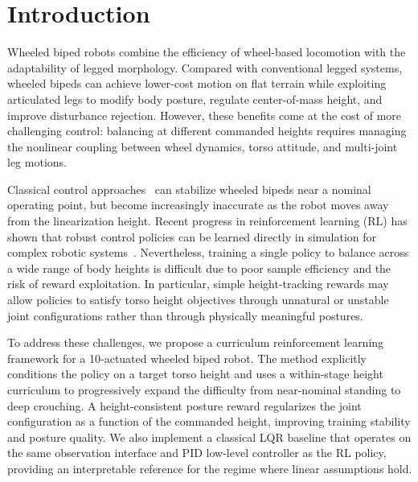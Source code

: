 \documentclass[conference]{IEEEtran}
\begin{document}
\section{Introduction}
Wheeled biped robots combine the efficiency of wheel-based locomotion with
the adaptability of legged morphology.
Compared with conventional legged systems, wheeled bipeds can achieve
lower-cost motion on flat terrain while exploiting articulated legs to modify
body posture, regulate center-of-mass height, and improve disturbance rejection.
However, these benefits come at the cost of more challenging control:
balancing at different commanded heights requires managing the nonlinear
coupling between wheel dynamics, torso attitude, and multi-joint leg motions.

Classical control approaches~\cite{klemm2020lqrwbc} can stabilize wheeled bipeds
near a nominal operating point, but become increasingly inaccurate as the
robot moves away from the linearization height.
Recent progress in reinforcement learning (RL) has shown that robust control
policies can be learned directly in simulation for complex robotic
systems~\cite{hwangbo2019learning,lee2020learning,rudin2022walk}.
Nevertheless, training a single policy to balance across a wide range of
body heights is difficult due to poor sample efficiency and the risk of
reward exploitation.
In particular, simple height-tracking rewards may allow policies to satisfy
torso height objectives through unnatural or unstable joint configurations
rather than through physically meaningful postures.

To address these challenges, we propose a curriculum reinforcement learning
framework for a 10-actuated wheeled biped robot.
The method explicitly conditions the policy on a target torso height and
uses a within-stage height curriculum to progressively expand the difficulty
from near-nominal standing to deep crouching.
A height-consistent posture reward regularizes the joint configuration as a
function of the commanded height, improving training stability and posture quality.
We also implement a classical LQR baseline that operates on the same observation
interface and PID low-level controller as the RL policy, providing an
interpretable reference for the regime where linear assumptions hold.
\end{document}
